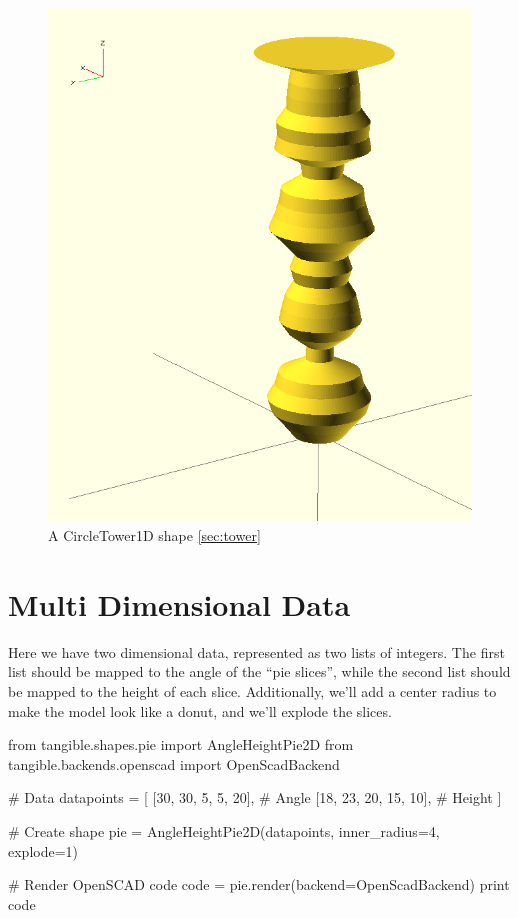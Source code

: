 \begin{figure}[H]
	\centering
	\includegraphics[height=.3\textheight]{images/tower.png}
	\caption{A CircleTower1D shape \eqref{sec:tower}}
	\label{img:tower}
\end{figure}


\newpage
\section{Multi Dimensional Data}\label{sec:multidimensional}

Here we have two dimensional data, represented as two lists of integers. The
first list should be mapped to the angle of the ``pie slices'', while the second
list should be mapped to the height of each slice. Additionally, we'll add a
center radius to make the model look like a donut, and we'll explode the slices.

\vspace{.5\baselineskip}
\begin{pythoncode}
from tangible.shapes.pie import AngleHeightPie2D
from tangible.backends.openscad import OpenScadBackend

# Data
datapoints = [
    [30, 30, 5, 5, 20], # Angle
    [18, 23, 20, 15, 10], # Height
]

# Create shape
pie = AngleHeightPie2D(datapoints, inner_radius=4,
                       explode=1)

# Render OpenSCAD code
code = pie.render(backend=OpenScadBackend)
print code
\end{pythoncode}
\vspace{.5\baselineskip}


